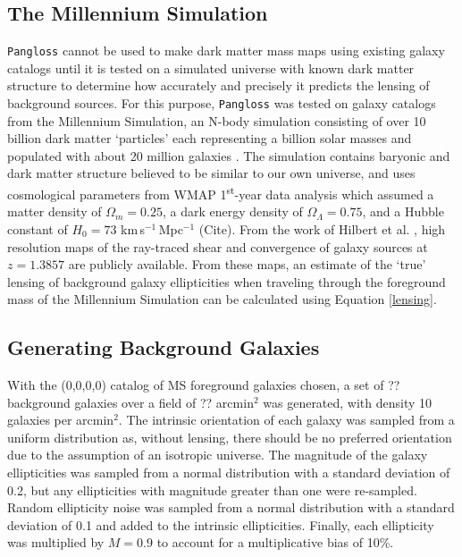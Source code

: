 \documentclass[%
 reprint,
 amsmath,amssymb,
 aps,nofootinbib
]{revtex4-1}
\begin{document}
\subsection{The Millennium Simulation} \label{ms}
\texttt{Pangloss} cannot be used to make dark matter mass maps using existing galaxy catalogs until it is tested on a simulated universe with known dark matter structure to determine how accurately and precisely it predicts the lensing of background sources. For this purpose, \texttt{Pangloss} was tested on galaxy catalogs from the Millennium Simulation, an N-body simulation consisting of over 10 billion dark matter `particles' each representing a billion solar masses and populated with about 20 million galaxies \cite{millennium_simulation}. The simulation contains baryonic and dark matter structure believed to be similar to our own universe, and uses cosmological parameters from WMAP 1\textsuperscript{st}-year data analysis which assumed a matter density of $\Omega_m=0.25$, a dark energy density of $\Omega_\Lambda=0.75$, and a Hubble constant of $H_0=73$ km$\,$s$^{-1}\,$Mpc$^{-1}$ (Cite). From the work of Hilbert et al. \cite{ray_tracing}, high resolution maps of the ray-traced shear and convergence of galaxy sources at $z=1.3857$ are publicly available. From these maps, an estimate of the `true' lensing of background galaxy ellipticities when traveling through the foreground mass of the Millennium Simulation can be calculated using Equation \eqref{lensing}.


\subsection{Generating Background Galaxies}
With the (0,0,0,0) catalog of MS foreground galaxies chosen, a set of ?? background galaxies over a field of ?? arcmin$^2$ was generated, with density 10 galaxies per arcmin$^2$. The intrinsic orientation of each galaxy was sampled from a uniform distribution as, without lensing, there should be no preferred orientation due to the assumption of an isotropic universe. The magnitude of the galaxy ellipticities was sampled from a normal distribution with a standard deviation of 0.2, but any ellipticities with magnitude greater than one were re-sampled. Random ellipticity noise was sampled from a normal distribution with a standard deviation of 0.1 and added to the intrinsic ellipticities. Finally, each ellipticity was multiplied by $M=0.9$ to account for a multiplicative bias of 10\%.
\end{document}
